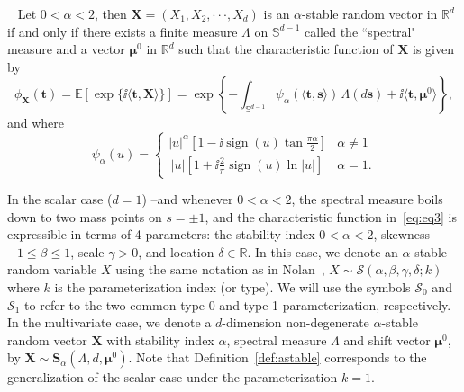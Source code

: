  \begin{definition}~\cite{SamorodnitskyGennady2000Snrp}
 \label{def:astable}
 Let $0<\alpha<2$, then $\mathbf{X}=(X_1,X_2,\cdot\cdot\cdot,X_d)$ is an $\alpha$-stable random vector in $\mathbb{R}^d$ if and only if there exists a finite measure \(\Lambda\) on $\mathbb{S}^{d-1}$ called the ``spectral" measure and a vector \(\boldsymbol{\mu}^{0}\) in $\mathbb{R}^d$ such that the characteristic function of $\mathbf{X}$ is given by
 \begin{equation}\label{eq:eq3}
    \phi_{\mathbf{X}}(\mathbf{t}) = \mathbb{E} \left[ \exp\{\ii ⟨ \mathbf{t},\mathbf{X}⟩\} \right]= \exp\left\{-\int_{\mathbb{S}^{d-1}} \psi_\alpha(⟨ \mathbf{t}, \mathbf{s} ⟩) \, \Lambda(d\mathbf{s}) + \ii ⟨ \mathbf{t},\boldsymbol{\mu}^0 ⟩\right\},
  \end{equation}
    and where \begin{equation*}
    \psi_\alpha(u) =
\begin{cases}
\displaystyle |u|^\alpha \left[ 1 - \ii \operatorname{sign}(u) \tan \frac{\pi \alpha}{2} \right] & \alpha \ne 1 \\
\displaystyle \, |u| \left[ 1 + \ii \frac{2}{\pi} \operatorname{sign}(u) \ln |u| \right] & \alpha = 1.
\end{cases}
\end{equation*}
\end{definition}

In the scalar case ($d = 1$) --and whenever $0<\alpha<2$, the spectral measure boils down to two mass points on $s = \pm 1$, and the characteristic function in~\eqref{eq:eq3} is expressible in terms of 4 parameters: the stability index $0<\alpha<2$, skewness $-1\leq\beta\leq1$, scale $\gamma>0$, and location $\delta\in\mathbb{R}$. In this case, we denote an \(\alpha\)-stable random variable $X$ using the same notation as in Nolan~\cite{NolanJohnP2020USDM}, \(X\!\sim\!\mathcal{S}(\alpha,\beta,\gamma,\delta;k)\) where $k$ is the parameterization index (or type). We will use the symbols $\mathcal{S}_0$ and $\mathcal{S}_1$ to refer to the two common type-0 and type-1 parameterization, respectively. In the multivariate case, we denote a $d$-dimension non-degenerate $\alpha$-stable random vector \(\mathbf{X}\) with stability index $\alpha$, spectral measure $\Lambda$ and shift vector $\boldsymbol{\mu}^0$, by $\mathbf{X}\sim\mathbf{S}_\alpha(\Lambda,d,\boldsymbol{\mu}^0)$. Note that Definition~\ref{def:astable} corresponds to the generalization of the scalar case under the parameterization $k=1$.

